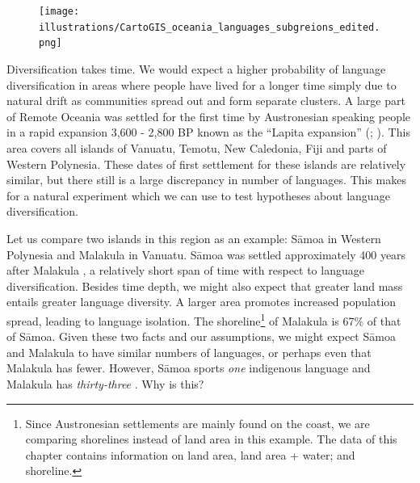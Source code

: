 \documentclass[a4paper,10pt]{article} %
\begin{document}
\begin{figure}
\centering
\texttt{[image: illustrations/CartoGIS\_oceania\_languages\_subgreions\_edited.png]}
\caption{}
\label{RO_overnight_coloured_dots}
\end{figure}







Diversification takes time. We would expect a higher probability of language diversification in areas where people have lived for a longer time simply due to natural drift as communities spread out and form separate clusters. A large part of Remote Oceania was settled for the first time by Austronesian speaking people in a rapid expansion 3,600 - 2,800 BP known as the ``Lapita expansion'' (\citet[106-7]{bellwood2006austronesians}; \citet[137]{rieth_cochrane_2018}). This area covers all islands of Vanuatu, Temotu, New Caledonia, Fiji and parts of Western Polynesia. These dates of first settlement for these islands are relatively similar, but there still is a large discrepancy in number of languages. This makes for a natural experiment which we can use to test hypotheses about language diversification.

Let us compare two islands in this region as an example: S\={a}moa in Western Polynesia and Malakula in Vanuatu. S\={a}moa was settled approximately 400 years after Malakula  \citep[137-8]{rieth_cochrane_2018}, a relatively short span of time with respect to language diversification. Besides time depth, we might also expect that greater land mass entails greater language diversity. A larger area promotes increased population spread, leading to language isolation. The shoreline\footnote{Since Austronesian settlements are mainly found on the coast, we are comparing shorelines instead of land area in this example. The data of this chapter contains information on land area, land area + water; and shoreline.} of Malakula is 67\% of that of S\={a}moa. Given these two facts and our assumptions, we might expect S\={a}moa and Malakula to have similar numbers of languages, or perhaps even that Malakula has fewer. However, S\={a}moa sports \emph{one} indigenous language and Malakula has \emph{thirty-three} \citep{glottolog40}. Why is this?

\end{document}

